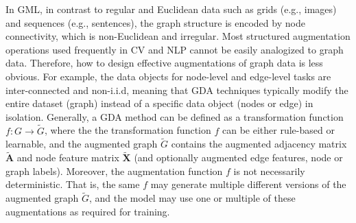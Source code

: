 \documentclass[11pt]{article}
\begin{document}
In GML, in contrast to regular and Euclidean data such as grids (e.g., images) and sequences (e.g., sentences), the graph structure is encoded by node connectivity, which is non-Euclidean and irregular. Most structured augmentation operations used frequently in CV and NLP cannot be easily analogized to graph data. Therefore, how to design effective augmentations of graph data is less obvious. For example, the data objects for node-level and edge-level tasks are inter-connected and non-i.i.d, meaning that GDA techniques typically modify the entire dataset (graph) instead of a specific data object (nodes or edge) in isolation. Generally, a GDA method can be defined as a transformation function $f: G \rightarrow \tilde{G}$, where the the transformation function $f$ can be either rule-based or learnable, and the augmented graph $\tilde{G}$ contains the augmented adjacency matrix $\tilde{\mathbf{A}}$ and node feature matrix $\tilde{\mathbf{X}}$ (and optionally augmented edge features, node or graph labels). Moreover, the augmentation function $f$ is not necessarily deterministic. That is, the same $f$ may generate multiple different versions of the augmented graph $\tilde{G}$, and the model may use one or multiple of these augmentations as required for training.
\end{document}

